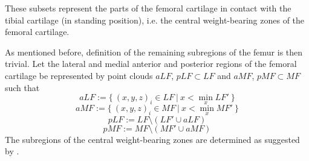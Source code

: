 \newline
These subsets represent the parts of the femoral cartilage in contact with the tibial cartilage (in standing position), i.e. the central weight-bearing zones of the femoral cartilage.
\par\noindent
As mentioned before, definition of the remaining subregions of the femur is then trivial. Let the lateral and medial anterior and posterior regions of the femoral cartilage be represented by point clouds $aLF$, $pLF \subset LF$ and $aMF$, $pMF \subset MF$ such that
\newline
\begin{equation}
	aLF := \{\:(x,y,z)_i \in LF \:|\: x < \min_{x} LF'\:\}
\end{equation}
\begin{equation}
	aMF := \{\:(x,y,z)_i \in MF \:|\: x < \min_{x} MF'\:\}
\end{equation}
\begin{equation}
	pLF := LF \setminus (LF' \cup aLF)
\end{equation}
\begin{equation}
	pMF := MF \setminus (MF' \cup aMF)
\end{equation}
\newline
The subregions of the central weight-bearing zones are determined as suggested by \cite{wirth2008technique}.